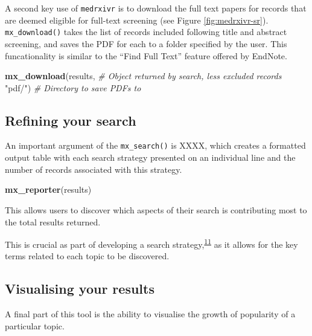 \documentclass[a4paper, twoside]{templates/ociamthesis}
\newenvironment{Shaded}{\begin{snugshade}}{\end{snugshade}}
\newcommand{\CommentTok}[1]{\textcolor[rgb]{0.56,0.35,0.01}{\textit{#1}}}
\newcommand{\KeywordTok}[1]{\textcolor[rgb]{0.13,0.29,0.53}{\textbf{#1}}}
\newcommand{\NormalTok}[1]{#1}
\newcommand{\StringTok}[1]{\textcolor[rgb]{0.31,0.60,0.02}{#1}}
\renewenvironment{Shaded}
{
  \vspace{4pt}%
  \begin{snugshade}%
}{%
  \end{snugshade}%
  \vspace{4pt}%
}
\begin{document}
A second key use of \texttt{medrxivr} is to download the full text papers for records that are deemed eligible for full-text screening (see Figure \ref{fig:medrxivr-sr}). \texttt{mx\_download()} takes the list of records included following title and abstract screening, and saves the PDF for each to a folder specified by the user. This funcationality is similar to the ``Find Full Text'' feature offered by EndNote.

\begin{Shaded}
\begin{Highlighting}[]
\KeywordTok{mx_download}\NormalTok{(results,        }\CommentTok{# Object returned by search, less excluded records}
            \StringTok{"pdf/"}\NormalTok{)         }\CommentTok{# Directory to save PDFs to }
\end{Highlighting}
\end{Shaded}

\hypertarget{refining-your-search}{%
\subsection{Refining your search}\label{refining-your-search}}

An important argument of the \texttt{mx\_search()} is XXXX, which creates a formatted output table with each search strategy presented on an individual line and the number of records associated with this strategy.

\begin{Shaded}
\begin{Highlighting}[]
\KeywordTok{mx_reporter}\NormalTok{(results)}
\end{Highlighting}
\end{Shaded}

This allows users to discover which aspects of their search is contributing most to the total results returned.

This is crucial as part of developing a search strategy,\textsuperscript{\protect\hyperlink{ref-bramer2018}{11}} as it allows for the key terms related to each topic to be discovered.

\hypertarget{visualising-your-results}{%
\subsection{Visualising your results}\label{visualising-your-results}}

A final part of this tool is the ability to visualise the growth of popularity of a particular topic.
\end{document}
